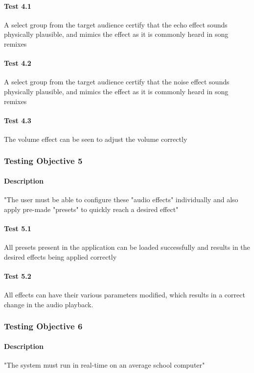 \paragraph{Test 4.1} A select group from the target audience certify that the echo effect sounds physically plausible, and mimics the effect as it is commonly heard in song remixes
\paragraph{Test 4.2} A select group from the target audience certify  that the noise effect sounds physically plausible, and mimics the effect as it is commonly heard in song remixes
\paragraph{Test 4.3} The volume effect can be seen to adjust the volume correctly

\pagebreak
\subsubsection{Testing Objective 5}
\paragraph{Description} "The user must be able to configure these "audio effects" individually and also apply pre-made "presets" to quickly reach a desired effect"

\paragraph{Test 5.1} All presets present in the application can be loaded successfully and results in the desired effects being applied correctly
\paragraph{Test 5.2} All effects can have their various parameters modified, which results in a correct change in the audio playback.

\pagebreak
\subsubsection{Testing Objective 6}
\paragraph{Description}  "The system must run in real-time on an average school computer"

